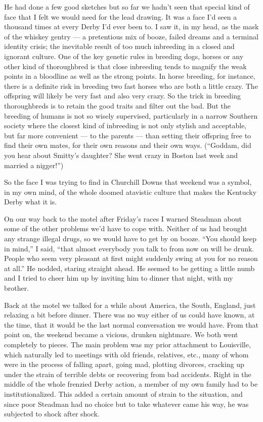 \documentclass[10pt,a4paper]{article}
\begin{document}
He had done a few good sketches but so far we hadn’t seen that special kind of face that I felt we would need for the lead drawing. It was a face I’d seen a thousand times at every Derby I’d ever been to. I saw it, in my head, as the mask of the whiskey gentry — a pretentious mix of booze, failed dreams and a terminal identity crisis; the inevitable result of too much inbreeding in a closed and ignorant culture. One of the key genetic rules in breeding dogs, horses or any other kind of thoroughbred is that close inbreeding tends to magnify the weak points in a bloodline as well as the strong points. In horse breeding, for instance, there is a definite risk in breeding two fast horses who are both a little crazy. The offspring will likely be very fast and also very crazy. So the trick in breeding thoroughbreds is to retain the good traits and filter out the bad. But the breeding of humans is not so wisely supervised, particularly in a narrow Southern society where the closest kind of inbreeding is not only stylish and acceptable, but far more convenient — to the parents — than setting their offspring free to find their own mates, for their own reasons and their own ways. (“Goddam, did you hear about Smitty’s daughter? She went crazy in Boston last week and married a nigger!”)

So the face I was trying to find in Churchill Downs that weekend was a symbol, in my own mind, of the whole doomed atavistic culture that makes the Kentucky Derby what it is.

On our way back to the motel after Friday’s races I warned Steadman about some of the other problems we’d have to cope with. Neither of us had brought any strange illegal drugs, so we would have to get by on booze. “You should keep in mind,” I said, “that almost everybody you talk to from now on will be drunk. People who seem very pleasant at first might suddenly swing at you for no reason at all.” He nodded, staring straight ahead. He seemed to be getting a little numb and I tried to cheer him up by inviting him to dinner that night, with my brother.

Back at the motel we talked for a while about America, the South, England, just relaxing a bit before dinner. There was no way either of us could have known, at the time, that it would be the last normal conversation we would have. From that point on, the weekend became a vicious, drunken nightmare. We both went completely to pieces. The main problem was my prior attachment to Louisville, which naturally led to meetings with old friends, relatives, etc., many of whom were in the process of falling apart, going mad, plotting divorces, cracking up under the strain of terrible debts or recovering from bad accidents. Right in the middle of the whole frenzied Derby action, a member of my own family had to be institutionalized. This added a certain amount of strain to the situation, and since poor Steadman had no choice but to take whatever came his way, he was subjected to shock after shock.
\end{document}
